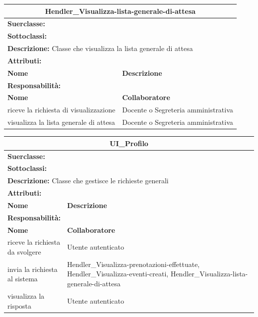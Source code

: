 \documentclass[11pt]{article}
\begin{document}
\begin{table}[H]
\centering
\begin{tabularx}{1\textwidth}{|X|X|}\hline
\multicolumn{2}{|c|}{\textbf{Hendler\_Visualizza-lista-generale-di-attesa}}\\\hline
\multicolumn{2}{|l|}{\textbf{Suerclasse:}}\\\hline
\multicolumn{2}{|l|}{\textbf{Sottoclassi:}}\\\hline
\multicolumn{2}{|l|}{\textbf{Descrizione:} Classe che visualizza la lista generale di attesa}\\\hline
\multicolumn{2}{|l|}{\textbf{Attributi:}}\\
\textbf{Nome} & \textbf{Descrizione}\\
\hline
\multicolumn{2}{|l|}{\textbf{Responsabilità:}}\\
\textbf{Nome} & \textbf{Collaboratore}\\
riceve la richiesta di visualizzazione & Docente o Segreteria amministrativa\\
visualizza la lista generale di attesa & Docente o Segreteria amministrativa\\
\hline
\end{tabularx}
\end{table}



\begin{table}[H]
\centering
\begin{tabularx}{1\textwidth}{|X|X|}\hline
\multicolumn{2}{|c|}{\textbf{UI\_Profilo}}\\\hline
\multicolumn{2}{|l|}{\textbf{Suerclasse:}}\\\hline
\multicolumn{2}{|l|}{\textbf{Sottoclassi:}}\\\hline
\multicolumn{2}{|l|}{\textbf{Descrizione:} Classe che gestisce le richieste generali}\\\hline
\multicolumn{2}{|l|}{\textbf{Attributi:}}\\
\textbf{Nome} & \textbf{Descrizione}\\
\hline
\multicolumn{2}{|l|}{\textbf{Responsabilità:}}\\
\textbf{Nome} & \textbf{Collaboratore}\\
riceve la richiesta da svolgere & Utente autenticato\\
invia la richiesta al sistema & Hendler\_Visualizza-prenotazioni-effettuate, Hendler\_Visualizza-eventi-creati, Hendler\_Visualizza-lista-generale-di-attesa\\
visualizza la risposta & Utente autenticato\\
\hline
\end{tabularx}
\end{table}
\end{document}
